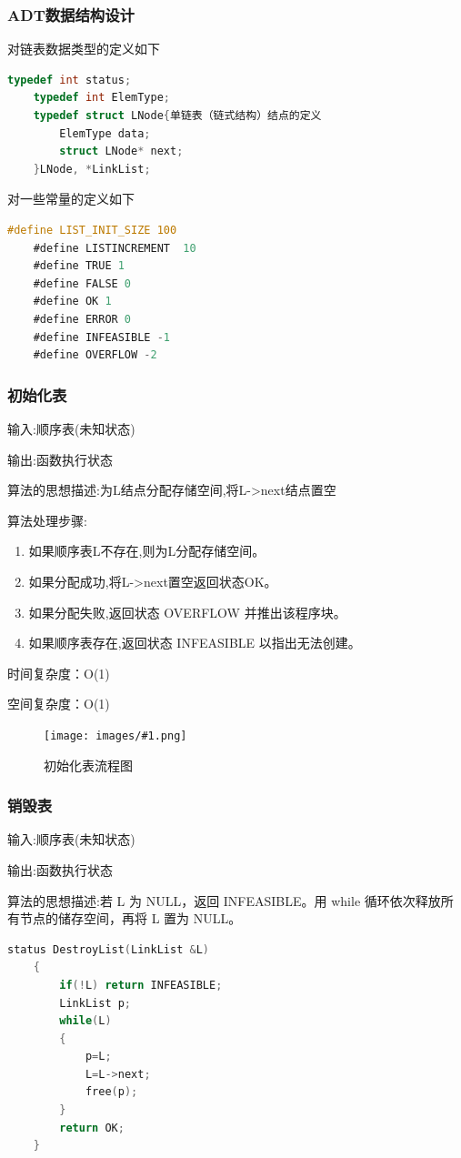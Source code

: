 \documentclass[supercite]{Experimental_Report}
\newcommand{\cfig}[3]{
	\begin{figure}[htb]
		\centering
		\texttt{[image: images/\#1.png]}
		\caption{#3}
		\label{fig:#1}
	\end{figure}
}
\theoremstyle{definition}
\begin{document}
\subsubsection{ADT数据结构设计}
\noindent 对链表数据类型的定义如下\par
\begin{lstlisting}[language=C] 
	typedef int status;
	typedef int ElemType;
	typedef struct LNode{单链表（链式结构）结点的定义
		ElemType data;
		struct LNode* next;
	}LNode, *LinkList;
\end{lstlisting}
对一些常量的定义如下
\begin{lstlisting}[language=C] 
	#define LIST_INIT_SIZE 100
	#define LISTINCREMENT  10
	#define TRUE 1
	#define FALSE 0
	#define OK 1
	#define ERROR 0
	#define INFEASIBLE -1
	#define OVERFLOW -2
\end{lstlisting}

\subsubsection{初始化表}
输入:顺序表(未知状态)

输出:函数执行状态

算法的思想描述:为L结点分配存储空间,将L->next结点置空

算法处理步骤:
\begin{enumerate}
	\renewcommand{\labelenumi}{\theenumi)}
	\item 如果顺序表L不存在,则为L分配存储空间。
	\item 如果分配成功,将L->next置空返回状态OK。
	\item 如果分配失败,返回状态 OVERFLOW 并推出该程序块。
	\item 如果顺序表存在,返回状态 INFEASIBLE 以指出无法创建。
\end{enumerate}

时间复杂度：O(1)

空间复杂度：O(1)

\cfig{1.2.3}{0.8}{初始化表流程图}
\subsubsection{销毁表}
输入:顺序表(未知状态)

输出:函数执行状态

算法的思想描述:若 L 为 NULL，返回 INFEASIBLE。用 while 循环依次释放所有节点的储存空间，再将 L 置为 NULL。

\begin{lstlisting}[language=C] 
	status DestroyList(LinkList &L)
	{
		if(!L) return INFEASIBLE;
		LinkList p;
		while(L)
		{
			p=L;
			L=L->next;
			free(p);
		}
		return OK;
	}
\end{lstlisting}
\end{document}
